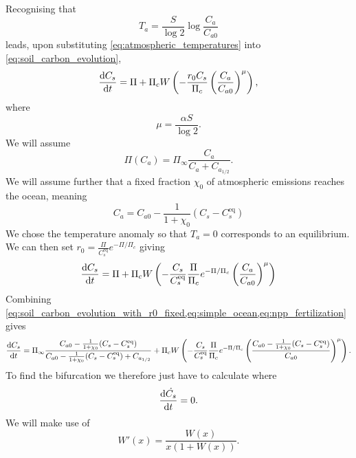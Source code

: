 Recognising that
\begin{equation}
  \label{eq:atmospheric_temperatures}
  T_a = \frac{S}{\log 2} \log \frac{C_a}{C_{a0}} 
\end{equation}
leads, upon substituting \cref{eq:atmospheric_temperatures} into \cref{eq:soil_carbon_evolution},
\begin{equation}
  \label{eq:global_soil_carbon}
  \dv{C_s}{t} = \Pi + \Pi_c W\left(-\frac{r_0C_s}{\Pi_c} \left(\frac{C_a}{C_{a0}}\right)^\mu \right),
\end{equation}
where
\begin{equation}
  \label{eq:mu}
  \mu = \frac{\alpha S}{\log 2}.
\end{equation}
We will assume
\begin{equation}
  \label{eq:npp_fertilization}
  \Pi(C_a) = \Pi_{\infty}\frac{C_a}{C_a + C_{a_{1/2}}}.
\end{equation}
We will assume further that a fixed fraction $\chi_0$ of atmospheric emissions reaches the ocean, meaning
\begin{equation}
  \label{eq:simple_ocean}
  C_a = C_{a0} -\frac{1}{1+\chi_0} (C_s - C_{s}^{\mathrm{eq}})
\end{equation}
We chose the temperature anomaly so that $T_a = 0$ corresponds to an equilibrium. We can then set
$r_0 = \frac{\Pi}{C_s^{\mathrm{eq}}}e^{-\Pi/\Pi_c}$ giving
\begin{equation}
  \label{eq:soil_carbon_evolution_with_r0_fixed}
  \dv{C_s}{t} = \Pi + \Pi_c W\left(-\frac{C_s}{C_s^{\mathrm{eq}}}\frac{\Pi}{\Pi_c}e^{-\Pi/\Pi_c} \left(\frac{C_a}{C_{a0}}\right)^\mu \right)
\end{equation}
Combining \cref{eq:soil_carbon_evolution_with_r0_fixed,eq:simple_ocean,eq:npp_fertilization} gives
\begin{equation}
  \label{eq:soil_carbon_evolution_combined}
  \dv{C_s}{t} = \Pi_{\infty}\frac{C_{a0} -\frac{1}{1+\chi_0} (C_s - C_{s}^{\mathrm{eq}})}{C_{a0} -\frac{1}{1+\chi_0} (C_s - C_{s}^{\mathrm{eq}})+ C_{a_{1/2}}}
  + \Pi_c W\left(-\frac{C_s}{C_s^{\mathrm{eq}}}\frac{\Pi}{\Pi_c}e^{-\Pi/\Pi_c} \left(\frac{C_{a0} -\frac{1}{1+\chi_0} (C_s - C_{s}^{\mathrm{eq}})}{C_{a0}}\right)^\mu \right).
\end{equation}
To find the bifurcation we therefore just have to calculate where
\begin{equation*}
  \dv{\dot{C_s}}{t} = 0.
\end{equation*}
We will make use of
\begin{equation}
  \label{eq:derivative_of_lambert_W}
  W'(x) = \frac{W(x)}{x\left(1 + W\left(x\right)\right)}.
\end{equation}

